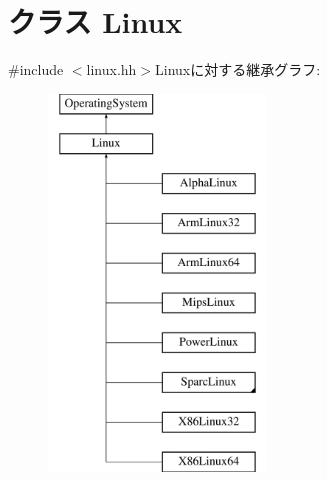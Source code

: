 \hypertarget{classLinux}{
\section{クラス Linux}
\label{classLinux}
}


{\ttfamily \#include $<$linux.hh$>$}Linuxに対する継承グラフ:\begin{figure}[H]
\begin{center}
\leavevmode
\includegraphics[height=10cm]{classLinux}
\end{center}
\end{figure}
